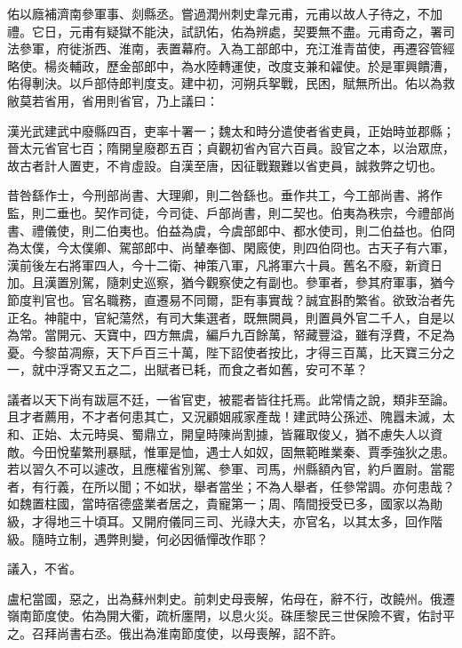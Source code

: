 \begin{pinyinscope}
 佑以廕補濟南參軍事、剡縣丞。嘗過潤州刺史韋元甫，元甫以故人子待之，不加禮。它日，元甫有疑獄不能決，試訊佑，佑為辨處，契要無不盡。元甫奇之，署司法參軍，府徙浙西、淮南，表置幕府。入為工部郎中，充江淮青苗使，再遷容管經略使。楊炎輔政，歷金部郎中，為水陸轉運使，改度支兼和糴使。於是軍興饋漕，佑得剸決。以戶部侍郎判度支。建中初，河朔兵挐戰，民困，賦無所出。佑以為救敝莫若省用，省用則省官，乃上議曰：



 漢光武建武中廢縣四百，吏率十署一；魏太和時分遣使者省吏員，正始時並郡縣；晉太元省官七百；隋開皇廢郡五百；貞觀初省內官六百員。設官之本，以治眾庶，故古者計人置吏，不肯虛設。自漢至唐，因征戰艱難以省吏員，誠救弊之切也。



 昔咎繇作士，今刑部尚書、大理卿，則二咎繇也。垂作共工，今工部尚書、將作監，則二垂也。契作司徒，今司徒、戶部尚書，則二契也。伯夷為秩宗，今禮部尚書、禮儀使，則二伯夷也。伯益為虞，今虞部郎中、都水使司，則二伯益也。伯冏為太僕，今太僕卿、駕部郎中、尚輦奉御、閑廄使，則四伯冏也。古天子有六軍，漢前後左右將軍四人，今十二衛、神策八軍，凡將軍六十員。舊名不廢，新資日加。且漢置別駕，隨刺史巡察，猶今觀察使之有副也。參軍者，參其府軍事，猶今節度判官也。官名職務，直遷易不同爾，詎有事實哉？誠宜斟酌繁省。欲致治者先正名。神龍中，官紀蕩然，有司大集選者，既無闕員，則置員外官二千人，自是以為常。當開元、天寶中，四方無虞，編戶九百餘萬，帑藏豐溢，雖有浮費，不足為憂。今黎苗凋瘵，天下戶百三十萬，陛下詔使者按比，才得三百萬，比天寶三分之一，就中浮寄又五之二，出賦者已耗，而食之者如舊，安可不革？



 議者以天下尚有跋扈不廷，一省官吏，被罷者皆往托焉。此常情之說，類非至論。且才者薦用，不才者何患其亡，又況顧姻戚家產哉！建武時公孫述、隗囂未滅，太和、正始、太元時吳、蜀鼎立，開皇時陳尚割據，皆羅取俊乂，猶不慮失人以資敵。今田悅輩繁刑暴賦，惟軍是恤，遇士人如奴，固無範睢業秦、賈季強狄之患。若以習久不可以遽改，且應權省別駕、參軍、司馬，州縣額內官，約戶置尉。當罷者，有行義，在所以聞；不如狀，舉者當坐；不為人舉者，任參常調。亦何患哉？如魏置柱國，當時宿德盛業者居之，貴寵第一；周、隋間授受已多，國家以為勛級，才得地三十頃耳。又開府儀同三司、光祿大夫，亦官名，以其太多，回作階級。隨時立制，遇弊則變，何必因循憚改作耶？



 議入，不省。



 盧杞當國，惡之，出為蘇州刺史。前刺史母喪解，佑母在，辭不行，改饒州。俄遷嶺南節度使。佑為開大衢，疏析廛閈，以息火災。硃厓黎民三世保險不賓，佑討平之。召拜尚書右丞。俄出為淮南節度使，以母喪解，詔不許。




\end{pinyinscope}
